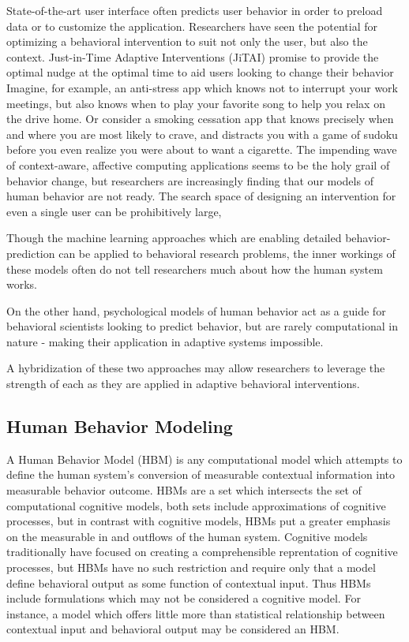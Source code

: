 \documentclass[conference]{IEEEtran}
\begin{document}
State-of-the-art user interface often predicts user behavior in order to preload data or to customize the application.
Researchers have seen the potential for optimizing a behavioral intervention to suit not only the user, but also the context. 
Just-in-Time Adaptive Interventions (JiTAI) promise to provide the optimal nudge at the optimal time to aid users looking to change their behavior
Imagine, for example, an anti-stress app which knows not to interrupt your work meetings, but also knows when to play your favorite song to help you relax on the drive home.
Or consider a smoking cessation app that knows precisely when and where you are most likely to crave, and distracts you with a game of sudoku before you even realize you were about to want a cigarette.
The impending wave of context-aware, affective computing applications seems to be the holy grail of behavior change, but researchers are increasingly finding that our models of human behavior are not ready.
The search space of designing an intervention for even a single user can be prohibitively large,

Though the machine learning approaches which are enabling detailed behavior-prediction can be applied to behavioral research problems, the inner workings of these models often do not tell researchers much about how the human system works. 

On the other hand, psychological models of human behavior act as a guide for behavioral scientists looking to predict behavior, but are rarely computational in nature - making their application in adaptive systems impossible.

A hybridization of these two approaches may allow researchers to leverage the strength of each as they are applied in adaptive behavioral interventions.

\subsection{Human Behavior Modeling}
A Human Behavior Model (HBM) is any computational model which attempts to define the human system’s conversion of measurable contextual information into measurable behavior outcome. 
HBMs are a set which intersects the set of computational cognitive models, both sets include approximations of cognitive processes, but in contrast with cognitive models, HBMs put a greater emphasis on the measurable in and outflows of the human system.
Cognitive models traditionally have focused on creating a comprehensible reprentation of cognitive processes, but HBMs have no such restriction and require only that a model define behavioral output as some function of contextual input.
Thus HBMs include formulations which may not be considered a cognitive model.
For instance, a model which offers little more than statistical relationship between contextual input and behavioral output may be considered an HBM.
\end{document}
